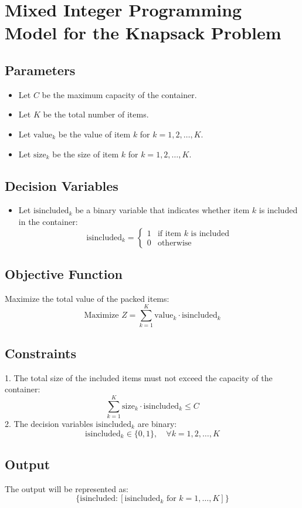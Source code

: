 \documentclass{article}
\begin{document}
\section*{Mixed Integer Programming Model for the Knapsack Problem}

\subsection*{Parameters}
\begin{itemize}
    \item Let \( C \) be the maximum capacity of the container.
    \item Let \( K \) be the total number of items.
    \item Let \( \text{value}_{k} \) be the value of item \( k \) for \( k = 1, 2, \ldots, K \).
    \item Let \( \text{size}_{k} \) be the size of item \( k \) for \( k = 1, 2, \ldots, K \).
\end{itemize}

\subsection*{Decision Variables}
\begin{itemize}
    \item Let \( \text{isincluded}_{k} \) be a binary variable that indicates whether item \( k \) is included in the container:
    \[
    \text{isincluded}_{k} =
    \begin{cases}
        1 & \text{if item } k \text{ is included} \\
        0 & \text{otherwise}
    \end{cases}
    \]
\end{itemize}

\subsection*{Objective Function}
Maximize the total value of the packed items:
\[
\text{Maximize } Z = \sum_{k=1}^{K} \text{value}_{k} \cdot \text{isincluded}_{k}
\]

\subsection*{Constraints}
1. The total size of the included items must not exceed the capacity of the container:
\[
\sum_{k=1}^{K} \text{size}_{k} \cdot \text{isincluded}_{k} \leq C
\]
2. The decision variables \( \text{isincluded}_{k} \) are binary:
\[
\text{isincluded}_{k} \in \{0, 1\}, \quad \forall k = 1, 2, \ldots, K
\]

\subsection*{Output}
The output will be represented as:
\[
\{\text{isincluded}: [\text{isincluded}_{k} \text{ for } k = 1, \ldots, K]\}
\]
\end{document}
